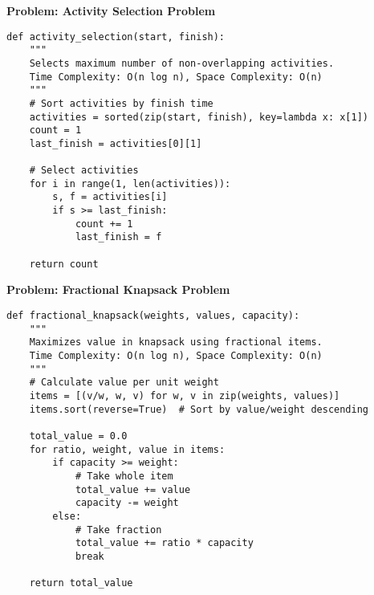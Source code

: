 % 
% 
\noindent\textbf{Problem: Activity Selection Problem}
\begin{verbatim}
def activity_selection(start, finish):
    """
    Selects maximum number of non-overlapping activities.
    Time Complexity: O(n log n), Space Complexity: O(n)
    """
    # Sort activities by finish time
    activities = sorted(zip(start, finish), key=lambda x: x[1])
    count = 1
    last_finish = activities[0][1]
    
    # Select activities
    for i in range(1, len(activities)):
        s, f = activities[i]
        if s >= last_finish:
            count += 1
            last_finish = f
    
    return count
\end{verbatim}

\noindent\textbf{Problem: Fractional Knapsack Problem}
\begin{verbatim}
def fractional_knapsack(weights, values, capacity):
    """
    Maximizes value in knapsack using fractional items.
    Time Complexity: O(n log n), Space Complexity: O(n)
    """
    # Calculate value per unit weight
    items = [(v/w, w, v) for w, v in zip(weights, values)]
    items.sort(reverse=True)  # Sort by value/weight descending
    
    total_value = 0.0
    for ratio, weight, value in items:
        if capacity >= weight:
            # Take whole item
            total_value += value
            capacity -= weight
        else:
            # Take fraction
            total_value += ratio * capacity
            break
    
    return total_value
\end{verbatim}

